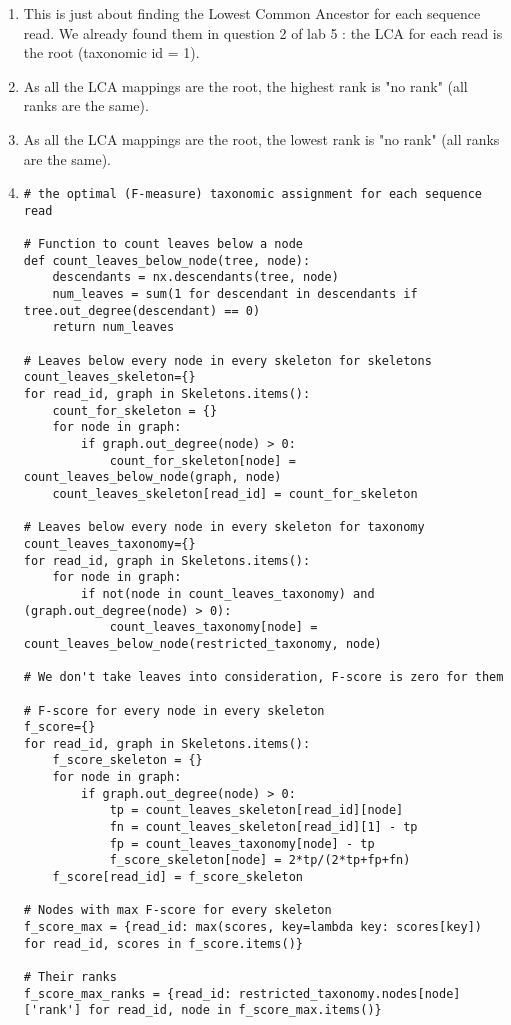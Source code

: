 \documentclass[12 pt,a4paper]{article}
\begin{document}
\begin{enumerate}
\item
This is just about finding the Lowest Common Ancestor for each sequence read. We already found them in question 2 of lab 5 : the LCA for each read is the root (taxonomic id = 1).
\item
As all the LCA mappings are the root, the highest rank is "no rank" (all ranks are the same).
\item 
As all the LCA mappings are the root, the lowest rank is "no rank" (all ranks are the same).
\item 
\begin{verbatim}
# the optimal (F-measure) taxonomic assignment for each sequence read

# Function to count leaves below a node
def count_leaves_below_node(tree, node):
    descendants = nx.descendants(tree, node)
    num_leaves = sum(1 for descendant in descendants if tree.out_degree(descendant) == 0)
    return num_leaves

# Leaves below every node in every skeleton for skeletons
count_leaves_skeleton={}
for read_id, graph in Skeletons.items():
    count_for_skeleton = {}
    for node in graph:
        if graph.out_degree(node) > 0:
            count_for_skeleton[node] = count_leaves_below_node(graph, node)
    count_leaves_skeleton[read_id] = count_for_skeleton

# Leaves below every node in every skeleton for taxonomy
count_leaves_taxonomy={}
for read_id, graph in Skeletons.items():
    for node in graph:
        if not(node in count_leaves_taxonomy) and (graph.out_degree(node) > 0):
            count_leaves_taxonomy[node] = count_leaves_below_node(restricted_taxonomy, node)

# We don't take leaves into consideration, F-score is zero for them

# F-score for every node in every skeleton    
f_score={}
for read_id, graph in Skeletons.items():
    f_score_skeleton = {}
    for node in graph:
        if graph.out_degree(node) > 0:
            tp = count_leaves_skeleton[read_id][node]
            fn = count_leaves_skeleton[read_id][1] - tp
            fp = count_leaves_taxonomy[node] - tp
            f_score_skeleton[node] = 2*tp/(2*tp+fp+fn) 
    f_score[read_id] = f_score_skeleton 

# Nodes with max F-score for every skeleton     
f_score_max = {read_id: max(scores, key=lambda key: scores[key]) for read_id, scores in f_score.items()}

# Their ranks
f_score_max_ranks = {read_id: restricted_taxonomy.nodes[node]['rank'] for read_id, node in f_score_max.items()}
\end{verbatim}


\end{enumerate}
\end{document}
